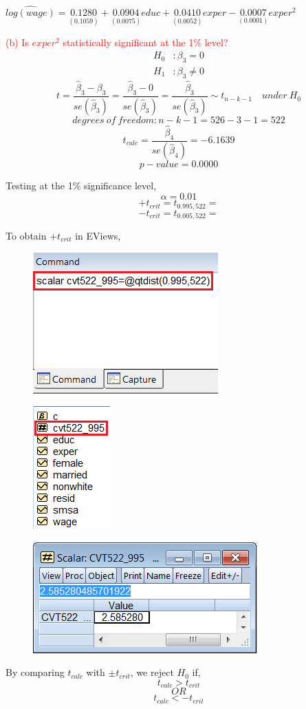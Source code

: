 \documentclass[12pt]{report}
\begin{document}
\centering $\widehat{log(wage)} = \underset{(0.1059)}{0.1280} + \underset{(0.0075)}{0.0904}educ + \underset{(0.0052)}{0.0410}exper - \underset{(0.0001)}{0.0007}exper^2$

\justify \noindent \textcolor{red}{(b) Is $exper^2$ statistically significant at the 1\% level?}
\begin{align*}
	H_0&: \beta_3 = 0 \\
	H_1&: \beta_3 \neq 0
\end{align*}
$$t = \dfrac{\hat{\beta}_3 - \beta_{3}}{se(\hat{\beta}_3)} = \dfrac{\hat{\beta}_3 - 0}{se(\hat{\beta}_3)} = \dfrac{\hat{\beta}_3}{se(\hat{\beta}_3)} \sim t_{n-k-1} \quad under\ H_0$$
$$degrees\ of\ freedom: n-k-1 = 526-3-1 = 522$$
$$t_{calc} = \dfrac{\hat{\beta}_4}{se(\hat{\beta}_4)} = -6.1639$$
$$p-value = 0.0000$$

\newpage
\noindent Testing at the 1\% significance level,
$$\alpha = 0.01$$
$$+t_{crit} = t_{0.995,522} =$$
$$-t_{crit} = t_{0.005,522} =$$

\noindent To obtain $+t_{crit}$ in EViews,
\begin{figure}[H]
	\centering
	\includegraphics{q2_4}
\end{figure}
\vspace{-\baselineskip}
\begin{figure}[H]
	\centering
	\includegraphics{q2_5}
\end{figure}
\vspace{-\baselineskip}
\begin{figure}[H]
	\centering
	\includegraphics{q2_6}
\end{figure}
\vspace{-\baselineskip}
\noindent By comparing $t_{calc}$ with $\pm t_{crit}$, we reject $H_0$ if, $$t_{calc} > t_{crit}$$ $$OR$$ $$t_{calc} < -t_{crit}$$
\end{document}
